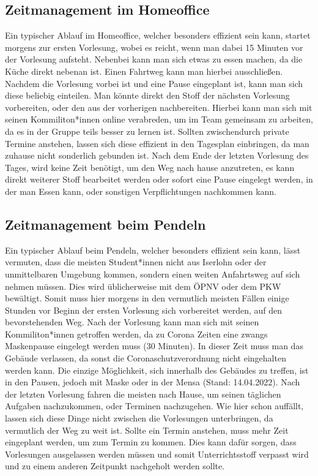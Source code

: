 \documentclass[a4paper,12pt]{scrartcl}
\begin{document}
\subsection{Zeitmanagement im Homeoffice}
Ein typischer Ablauf im Homeoffice, welcher besonders effizient sein kann, startet morgens zur ersten Vorlesung, wobei es reicht, wenn man dabei 15 Minuten vor der Vorlesung aufsteht. Nebenbei kann man sich etwas zu essen machen, da die Küche direkt nebenan ist. Einen Fahrtweg kann man hierbei ausschließen. Nachdem die Vorlesung vorbei ist und eine Pause eingeplant ist, kann man sich diese beliebig einteilen. Man könnte direkt den Stoff der nächsten Vorlesung vorbereiten, oder den aus der vorherigen nachbereiten. Hierbei kann man sich mit seinen Kommiliton*innen online verabreden, um im Team gemeinsam zu arbeiten, da es in der Gruppe teils besser zu lernen ist. Sollten zwischendurch private Termine anstehen, lassen sich diese effizient in den Tagesplan einbringen, da man zuhause nicht sonderlich gebunden ist. Nach dem Ende der letzten Vorlesung des Tages, wird keine Zeit benötigt, um den Weg nach hause anzutreten, es kann direkt weiterer Stoff bearbeitet werden oder sofort eine Pause eingelegt werden, in der man Essen kann, oder sonstigen Verpflichtungen nachkommen kann.

\subsection{Zeitmanagement beim Pendeln}
Ein typischer Ablauf beim Pendeln, welcher besonders effizient sein kann, lässt vermuten, dass die meisten Student*innen nicht aus Iserlohn oder der unmittelbaren Umgebung kommen, sondern einen weiten Anfahrtsweg auf sich nehmen müssen. Dies wird üblicherweise mit dem ÖPNV oder dem PKW bewältigt. Somit muss hier morgens in den vermutlich meisten Fällen einige Stunden vor Beginn der ersten Vorlesung sich vorbereitet werden, auf den bevorstehenden Weg. Nach der Vorlesung kann man sich mit seinen Kommiliton*innen getroffen werden, da zu Corona Zeiten eine zwangs Maskenpause eingelegt werden muss (30 Minuten). In dieser Zeit muss man das Gebäude verlassen, da sonst die Coronaschutzverordnung nicht eingehalten werden kann. Die einzige Möglichkeit, sich innerhalb des Gebäudes zu treffen, ist in den Pausen, jedoch mit Maske oder in der Mensa (Stand: 14.04.2022). Nach der letzten Vorlesung fahren die meisten nach Hause, um seinen täglichen Aufgaben nachzukommen, oder Terminen nachzugehen. Wie hier schon auffällt, lassen sich diese Dinge nicht zwischen die Vorlesungen unterbringen, da vermutlich der Weg zu weit ist. Sollte ein Termin anstehen, muss mehr Zeit eingeplant werden, um zum Termin zu kommen. Dies kann dafür sorgen, dass Vorlesungen ausgelassen werden müssen und somit Unterrichtsstoff verpasst wird und zu einem anderen Zeitpunkt nachgeholt werden sollte.
\end{document}
